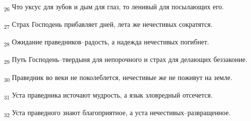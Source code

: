 \begin{tcolorbox}
\textsubscript{26} Что уксус для зубов и дым для глаз, то ленивый для посылающих его.
\end{tcolorbox}
\begin{tcolorbox}
\textsubscript{27} Страх Господень прибавляет дней, лета же нечестивых сократятся.
\end{tcolorbox}
\begin{tcolorbox}
\textsubscript{28} Ожидание праведников--радость, а надежда нечестивых погибнет.
\end{tcolorbox}
\begin{tcolorbox}
\textsubscript{29} Путь Господень--твердыня для непорочного и страх для делающих беззаконие.
\end{tcolorbox}
\begin{tcolorbox}
\textsubscript{30} Праведник во веки не поколеблется, нечестивые же не поживут на земле.
\end{tcolorbox}
\begin{tcolorbox}
\textsubscript{31} Уста праведника источают мудрость, а язык зловредный отсечется.
\end{tcolorbox}
\begin{tcolorbox}
\textsubscript{32} Уста праведного знают благоприятное, а уста нечестивых--развращенное.
\end{tcolorbox}
